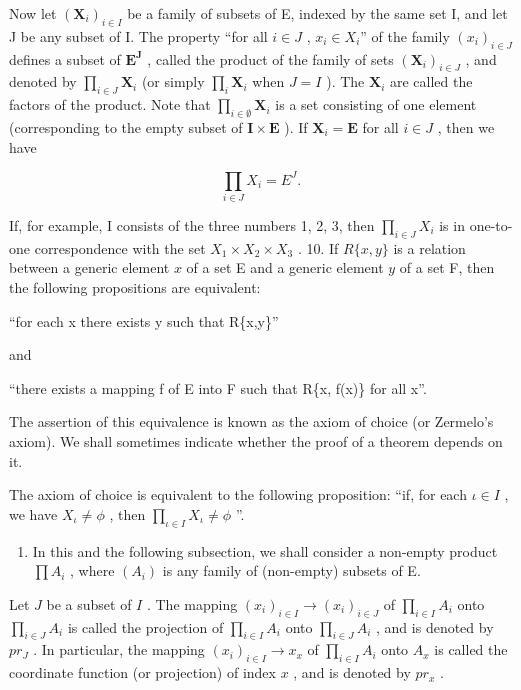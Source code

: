 Now let \((\mathbf{X}_i)_{i\in I}\) be a family of subsets of E, indexed by the same set I, and let J be any subset of I. The property ``for all \(i\in J\) , \(x_i\in X_i\)'' of the family \((x_i)_{i\in J}\) defines a subset of \(\mathbf{E}^{\mathbf{J}}\) , called the product of the family of sets \((\mathbf{X}_i)_{i\in J}\) , and denoted by \(\prod_{i\in J}\mathbf{X}_i\) (or simply \(\prod_{i}\mathbf{X}_i\) when \(J = I\) ). The \(\mathbf{X}_i\) are called the factors of the product. Note that \(\prod_{i\in \emptyset}\mathbf{X}_i\) is a set consisting of one element (corresponding to the empty subset of \(\mathbf{I}\times \mathbf{E}\) ). If \(\mathbf{X}_i = \mathbf{E}\) for all \(i\in J\) , then we have

\[
\prod_ {i \in J} X _ {i} = E ^ {J}.
\]

If, for example, I consists of the three numbers 1, 2, 3, then \(\prod_{i\in J}X_i\) is in one-to-one correspondence with the set \(X_1\times X_2\times X_3\) . 10. If \(R\{x,y\}\) is a relation between a generic element \(x\) of a set E and a generic element \(y\) of a set F, then the following propositions are equivalent:

``for each x there exists y such that R\{x,y\}''

and

``there exists a mapping f of E into F such that R\{x, f(x)\} for all x''.

The assertion of this equivalence is known as the axiom of choice (or Zermelo's axiom). We shall sometimes indicate whether the proof of a theorem depends on it.

The axiom of choice is equivalent to the following proposition: ``if, for each \(\iota\in I\) , we have \(X_{\iota}\neq\phi\) , then \(\prod_{\iota\in I}X_{\iota}\neq\phi\) ''.

\begin{enumerate}
\def\labelenumi{\arabic{enumi}.}
\setcounter{enumi}{10}
\tightlist
\item
  In this and the following subsection, we shall consider a non-empty product \(\prod A_{i}\) , where \((A_{i})\) is any family of (non-empty) subsets of E.
\end{enumerate}

Let \(J\) be a subset of \(I\) . The mapping \((x_{i})_{i\in I}\to(x_{i})_{i\in J}\) of \(\prod_{i\in I}A_{i}\) onto \(\prod_{i\in J}A_{i}\) is called the projection of \(\prod_{i\in I}A_{i}\) onto \(\prod_{i\in J}A_{i}\) , and is denoted by \(pr_{J}\) . In particular, the mapping \((x_{i})_{i\in I}\to x_{x}\) of \(\prod_{i\in I}A_{i}\) onto \(A_{x}\) is called the coordinate function (or projection) of index \(x\) , and is denoted by \(pr_{x}\) .

